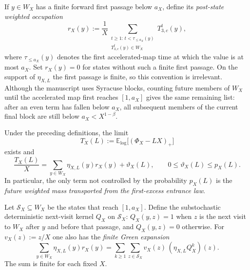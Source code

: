 If $y\in W_X$ has a finite forward first passage below $a_X$, define
its \emph{post-state weighted occupation}
\begin{equation}\label{eq:fe-future-mass}
 r_X(y):=\frac1X\sum_{\substack{t\ge1:\,t<\tau_{\le a_X}(y)\\
                        T_{3,c}^{t}(y)\in W_X}}T_{3,c}^{t}(y),
\end{equation}
where $\tau_{\le a_X}(y)$ denotes the first accelerated-map time
at which the value is at most $a_X$.  Set $r_X(y)=0$ for states
without such a finite first passage.  On the support of
$\eta_{X,L}$ the first passage is finite, so this convention is
irrelevant.  Although the manuscript uses Syracuse blocks, counting
future members of $W_X$ until the accelerated map first reaches
$[1,a_X]$ gives the same remaining list: after an even term has
fallen below $a_X$, all subsequent members of the current final
block are still below $a_X<X^{1-\beta}$.

\begin{theorem}
\label{thm:first-excess-identity}
Under the preceding definitions, the limit
\[
  T_X(L):=\mathbb E_{\log}\bigl[(\Phi_X-LX)_+\bigr]
\]
exists and
\begin{equation}\label{eq:fe-exact}
 \boxed{\quad
 \frac{T_X(L)}X=\sum_{y\in W_X}\eta_{X,L}(y)r_X(y)
                    +\vartheta_X(L),\qquad
 0\le\vartheta_X(L)\le p_X(L).
 \quad}
\end{equation}
In particular, the only term not controlled by the probability
$p_X(L)$ is the \emph{future weighted mass transported from the
first-excess entrance law}.

Let $\mathcal S_X\subseteq W_X$ be the states that reach $[1,a_X]$.
Define the substochastic deterministic next-visit kernel $Q_X$ on
$\mathcal S_X$: $Q_X(y,z)=1$ when $z$ is the next visit to $W_X$
after $y$ and before that passage, and $Q_X(y,z)=0$ otherwise.
For $v_X(z):=z/X$ one also has the \emph{finite Green expansion}
\begin{equation}\label{eq:fe-green}
 \sum_{y\in W_X}\eta_{X,L}(y)r_X(y)
 =\sum_{k\ge1}\sum_{z\in\mathcal S_X}
            v_X(z)\,(\eta_{X,L}Q_X^k)(z).
\end{equation}
The sum is finite for each fixed $X$.
\end{theorem}

